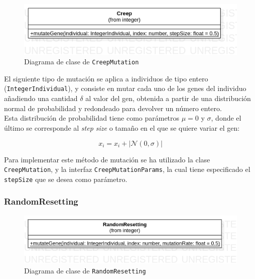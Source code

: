 \begin{figure}[ht]
    \centering
    \includegraphics[scale=0.4]{mem/images/cap-4/4.2.7(Mutation)/CreepMutatioon.png}
    \caption{Diagrama de clase de \texttt{CreepMutation}}
    \label{fig:my_label}
\end{figure}

El siguiente tipo de mutación se aplica a individuos de tipo entero (\texttt{IntegerIndividual}), y consiste en mutar cada uno de los genes del individuo añadiendo una cantidad $\delta$ al valor del gen, obtenida a partir de una distribución normal de probabilidad y redondeado para devolver un número entero. \\

Esta distribución de probabilidad tiene como parámetros $\mu = 0$ y $\sigma$, donde el último se corresponde al \textit{step size} o tamaño en el que se quiere variar el gen:

\begin{equation}
    x_i = x_i + |\mathcal{N}(0, \sigma)|
\end{equation}

Para implementar este método de mutación se ha utilizado la clase \texttt{CreepMutation}, y la interfaz \texttt{CreepMutationParams}, la cual tiene especificado el \texttt{stepSize} que se desea como parámetro.

\subsubsection{RandomResetting}

\begin{figure}[ht]
    \centering
    \includegraphics[scale=0.4]{mem/images/cap-4/4.2.7(Mutation)/RandomResetting.png}
    \caption{Diagrama de clase de \texttt{RandomResetting}}
    \label{fig:my_label}
\end{figure}

